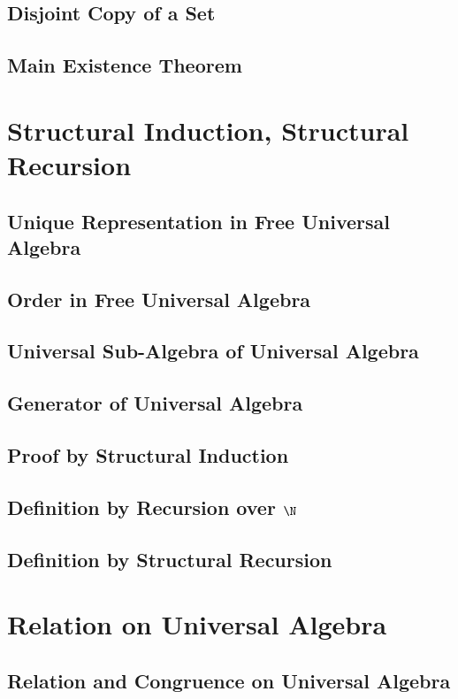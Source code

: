 \documentclass{report}
\begin{document}
    \subsection{Disjoint Copy of a Set}
    \subsection{Main Existence Theorem}
\section{Structural Induction, Structural Recursion}
    \subsection{Unique Representation in Free Universal Algebra}
    \subsection{Order in Free Universal Algebra}
    \subsection{Universal Sub-Algebra of Universal Algebra}
    \subsection{Generator of Universal Algebra}
    \subsection{Proof by Structural Induction}
    \subsection{Definition by Recursion over $\N$}
    \subsection{Definition by Structural Recursion}
\section{Relation on Universal Algebra}
    \subsection{Relation and Congruence on Universal Algebra}
\end{document}
